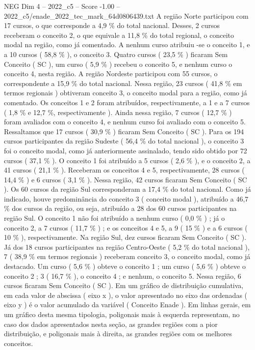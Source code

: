 \begin{textsample}{NEG Dim 4 – 2022\_c5 – Score -1.00 – 2022\_c5/enade\_2022\_tec\_mark\_64d0806439.txt}
A região Norte participou com 17 cursos, o que corresponde a 4,9 \% do total nacional.
Desses, 2 cursos receberam o conceito 2, o que equivale a 11,8 \% do total regional, o conceito modal na região, como já comentado.
A nenhum curso atribuiu -se o conceito 1, e a 10 cursos ( 58,8 \% ), o conceito 3.
Quatro cursos ( 23,5 \% ) ficaram Sem Conceito ( SC ), um curso ( 5,9 \% ) recebeu o conceito 5, e nenhum curso o conceito 4, nesta região.
A região Nordeste participou com 55 cursos, o correspondente a 15,9 \% do total nacional.
Nessa região, 23 cursos ( 41,8 \% em termos regionais ) obtiveram conceito 3, o conceito modal para a região, como já comentado.
Os conceitos 1 e 2 foram atribuídos, respectivamente, a 1 e a 7 cursos ( 1,8 \% e 12,7 \%, respectivamente ).
Ainda nessa região, 7 cursos ( 12,7 \% ) foram avaliados com o conceito 4, e nenhum curso foi avaliado com o conceito 5.
Ressaltamos que 17 cursos ( 30,9 \% ) ficaram Sem Conceito ( SC ).
Para os 194 cursos participantes da região Sudeste ( 56,4 \% do total nacional ), o conceito 3 foi o conceito modal, como já anteriormente assinalado, tendo sido obtido por 72 cursos ( 37,1 \% ).
O conceito 1 foi atribuído a 5 cursos ( 2,6 \% ), e o conceito 2, a 41 cursos ( 21,1 \% ).
Receberam os conceitos 4 e 5, respectivamente, 28 cursos ( 14,4 \% ) e 6 cursos ( 3,1 \% ).
Nessa região, 42 cursos ficaram Sem Conceito ( SC ).
Os 60 cursos da região Sul corresponderam a 17,4 \% do total nacional.
Como já indicado, houve predominância do conceito 3 ( conceito modal ), atribuído a 46,7 \% dos cursos da região, ou seja, atribuído a 28 dos 60 cursos participantes na região Sul.
O conceito 1 não foi atribuído a nenhum curso ( 0,0 \% ) ; já o conceito 2, a 7 cursos ( 11,7 \% ) ; e os conceitos 4 e 5, a 9 ( 15 \% ) e a 6 cursos ( 10 \% ), respectivamente.
Na região Sul, dez cursos ficaram Sem Conceito ( SC ).
Já dos 18 cursos participantes na região Centro-Oeste ( 5,2 \% do total nacional ), 7 ( 38,9 \% em termos regionais ) receberam conceito 3, o conceito modal, como já destacado.
Um curso ( 5,6 \% ) obteve o conceito 1 ; um curso ( 5,6 \% ) obteve o conceito 2 ; 3 ( 16,7 \% ), o conceito 4 ; e nenhum, o conceito 5.
Nessa região, 6 cursos ficaram Sem Conceito ( SC ).
Em um gráfico de distribuição cumulativa, em cada valor de abscissa ( eixo x ), o valor apresentado no eixo das ordenadas ( eixo y ) é o valor acumulado da variável ( Conceito Enade ).
Em linhas gerais, em um gráfico desta mesma tipologia, poligonais mais à esquerda representam, no caso dos dados apresentados nesta seção, as grandes regiões com a pior distribuição, e poligonais mais à direita, as grandes regiões com os melhores conceitos.

\end{textsample}
